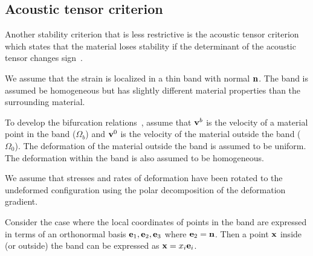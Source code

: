 \subsection{Acoustic tensor criterion}
Another stability criterion that is less restrictive is the acoustic
tensor criterion which states that the material loses stability if the 
determinant of the acoustic tensor changes sign~\cite{Rudnicki1975,Yamamoto1978,Perzyna1998}.  

We assume that the strain is localized in a thin band with normal $\mathbf{n}$.  The band is 
assumed be homogeneous
but has slightly different material properties than the surrounding material.

To develop the bifurcation relations~\cite{Yamamoto1978}, assume that $\mathbf{v}^b$ is the 
velocity of a material point in the band ($\Omega_b$) and $\mathbf{v}^0$ is the velocity of the 
material outside the band ($\Omega_0$).  The deformation of the material outside the band
is assumed to be uniform.  The deformation within the band is also assumed to
be homogeneous.

We assume that stresses and rates of deformation have been rotated to the undeformed
configuration using the polar decomposition of the deformation gradient.

Consider the case where the local coordinates of points in the band are expressed in
terms of an orthonormal basis $\mathbf{e}_1, \mathbf{e}_2, \mathbf{e}_3$ where $\mathbf{e}_2 = \mathbf{n}$.  Then
a point $\mathbf{x}$ inside (or outside) the band can be expressed as $\mathbf{x} = x_i \mathbf{e}_i$.

